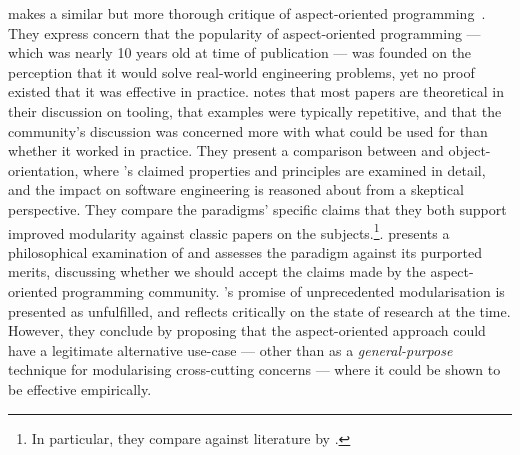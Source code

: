 \citeauthor{steimann06paradoxical} makes a similar but more thorough critique of
aspect-oriented programming~\cite{steimann06paradoxical}. They express concern
that the popularity of aspect-oriented programming --- which was nearly 10 years
old at time of publication --- was founded on the perception that it would solve
real-world engineering problems, yet no proof existed that it was effective in
practice. \citeauthor{steimann06paradoxical} notes that most papers are
theoretical in their discussion on tooling, that examples were typically
repetitive, and that the community's discussion was concerned more with what
\aspectorientation{} could be used for than whether it worked in practice. They
present a comparison between \aspectorientation{} and object-orientation, where
\aspectorientation{}'s claimed properties and principles are examined in detail,
and the impact on software engineering is reasoned about from a skeptical
perspective. They compare the paradigms' specific claims that they both support
improved modularity against classic papers on the subjects.\footnote{In
  particular, they compare against literature by \citet{parnas_1972}.}.
\citeauthor{steimann06paradoxical} presents a philosophical examination of
\aspectorientation{} and assesses the paradigm against its purported merits,
discussing whether we should accept the claims made by the aspect-oriented
programming community. \Aspectorientation{}'s promise of unprecedented
modularisation is presented as unfulfilled, and
\citeauthor{steimann06paradoxical} reflects critically on the state of
\aspectorientation{} research at the time. However, they conclude by proposing
that the aspect-oriented approach could have a legitimate alternative use-case
--- other than as a \emph{general-purpose} technique for modularising
cross-cutting concerns --- where it could be shown to be effective empirically.

